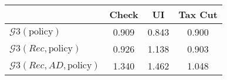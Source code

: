 \begin{tabular}{@{}lccc@{}} 
\toprule 
                          & Check      & UI    & Tax Cut    \\  \midrule 
$\mathcal{G}3(\text{policy})$ & 0.909  & 0.843  & 0.900     \\ 
$\mathcal{G}3(Rec,\text{policy})$ & 0.926  & 1.138  & 0.903     \\ 
$\mathcal{G}3(Rec, AD,\text{policy})$ & 1.340  & 1.462  & 1.048     \\ 
\end{tabular}  
